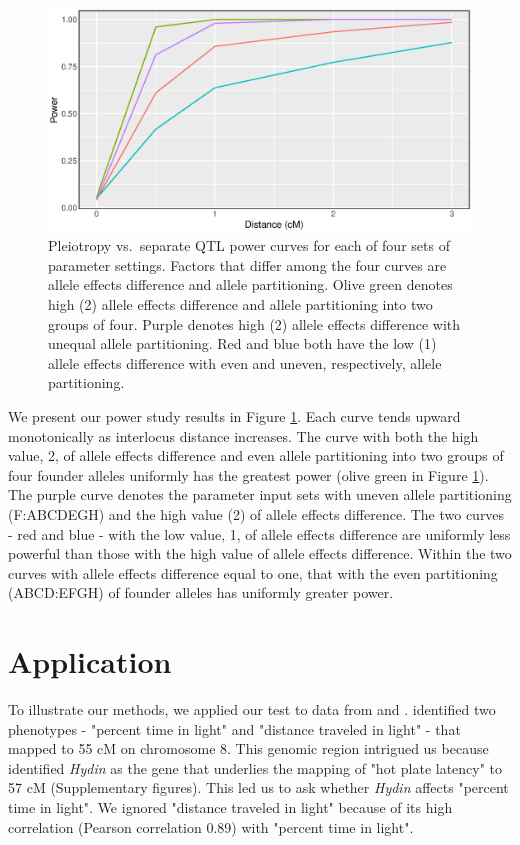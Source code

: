 \documentclass[12pt,twoside, lineno]{gsajnl}
\begin{document}
\begin{figure}
\includegraphics[width = \textwidth]{../R/power-curves.eps}
\caption{Pleiotropy vs.\ separate QTL power curves for each of four
  sets of parameter settings. Factors that differ among the four
  curves are allele effects difference and allele partitioning. Olive
  green denotes high (2) allele effects difference and allele
  partitioning into two groups of four. Purple denotes high (2) allele
  effects difference with unequal allele partitioning. Red and blue
  both have the low (1) allele effects difference with even and
  uneven, respectively, allele partitioning.}
\label{fig:power}
\end{figure}

We present our power study results in Figure \ref{fig:power}. Each
curve tends upward monotonically as interlocus distance increases. The
curve with both the high value, 2, of allele effects difference and
even allele partitioning into two groups of four founder alleles
uniformly has the greatest power (olive green in Figure
\ref{fig:power}). The purple curve denotes the parameter input sets
with uneven allele partitioning (F:ABCDEGH) and the high value (2) of
allele effects difference. The two curves - red and blue - with the
low value, 1, of allele effects difference are uniformly less powerful
than those with the high value of allele effects difference. Within
the two curves with allele effects difference equal to one, that with
the even partitioning (ABCD:EFGH) of founder alleles has uniformly
greater power.


\section{Application}
\label{sec:app}

To illustrate our methods, we applied our test to data from
\citet{logan2013high} and \citet{recla2014precise}.
\citet{logan2013high} identified two phenotypes - "percent time in
light" and "distance traveled in light" - that mapped to 55 cM on
chromosome 8. This genomic region intrigued us because
\citet{recla2014precise} identified \textit{Hydin} as the gene that
underlies the mapping of "hot plate latency" to 57 cM (Supplementary
figures). This led us to ask whether \textit{Hydin} affects "percent
time in light". We ignored "distance traveled in light" because of its
high correlation (Pearson correlation 0.89) with "percent time in
light".
\end{document}
